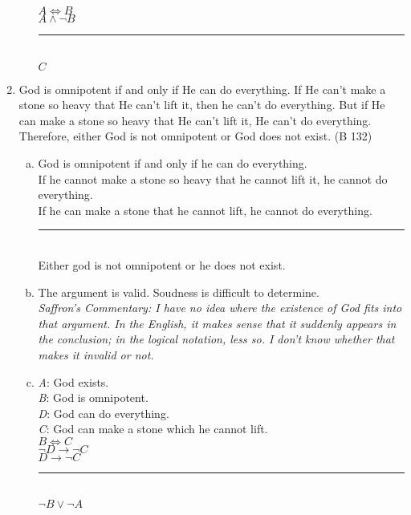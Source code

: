 \documentclass{article}
\begin{document}
\begin{enumerate}
\begin{enumerate}[(a)]
                    $A \iff B$\\
                    $A \land \neg B$\\
                    \rule{5em}{.5pt}\\
                    $C$
          \end{enumerate}
    \item God is omnipotent if and only if He can do everything. If He can't make a stone so heavy that He can't lift it, then he can't do everything. But if He can make a stone so heavy that He can't lift it, He can't do everything. Therefore, either God is not omnipotent or God does not exist. (B 132)
          \begin{enumerate}[(a)]
              \item God is omnipotent if and only if he can do everything.\\
                    If he cannot make a stone so heavy that he cannot lift it, he cannot do everything.\\
                    If he can make a stone that he cannot lift, he cannot do everything.\\
                    \rule{15em}{.5pt}\\
                    Either god is not omnipotent or he does not exist.
              \item The argument is valid. Soudness is difficult to determine.\\
                    \textit{Saffron's Commentary: I have no idea where the existence of God fits into that argument. In the English, it makes sense that it suddenly appears in the conclusion; in the logical notation, less so. I don't know whether that makes it invalid or not.}
              \item \textit{A}: God exists.\\
                    \textit{B}: God is omnipotent.\\
                    \textit{D}: God can do everything.\\
                    \textit{C}: God can make a stone which he cannot lift.\\

                    $B \iff C$\\
                    $\neg D \to \neg C$\\
                    $D \to \neg C$\\
                    \rule{5em}{.5pt}\\
                    $\neg B \lor \neg A$
          \end{enumerate}
\end{enumerate}
\end{document}

